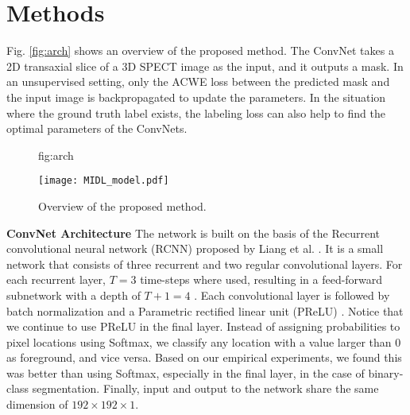 \documentclass{midl}
\begin{document}
\section{Methods}
Fig. \ref{fig:arch} shows an overview of the proposed method. The ConvNet takes a 2D transaxial slice of a 3D SPECT image as the input, and it outputs a mask. In an unsupervised setting, only the ACWE loss between the predicted mask and the input image is backpropagated to update the parameters. In the situation where the ground truth label exists, the labeling loss can also help to find the optimal parameters of the ConvNets.


\begin{figure}[htbp]
\floatconts
  {fig:arch}
  {\caption{Overview of the proposed method.}}
  {\texttt{[image: MIDL\_model.pdf]}}
\end{figure}

\noindent\textbf{ConvNet Architecture} The network is built on the basis of the Recurrent convolutional neural network (RCNN) proposed by Liang et al. \cite{Liang2015}. It is a small network that consists of three recurrent and two regular convolutional layers. For each recurrent layer, $T=3$ time-steps where used, resulting in a feed-forward subnetwork with a depth of $T+1=4$ \cite{Liang2015}. Each convolutional layer is followed by batch normalization and a Parametric rectified linear unit (PReLU) \cite{He2015}. Notice that we continue to use PReLU in the final layer. Instead of assigning probabilities to pixel locations using Softmax, we classify any location with a value larger than 0 as foreground, and vice versa. Based on our empirical experiments, we found this was better than using Softmax, especially in the final layer, in the case of binary-class segmentation. Finally, input and output to the network share the same dimension of $192\times192\times1$.
\end{document}
